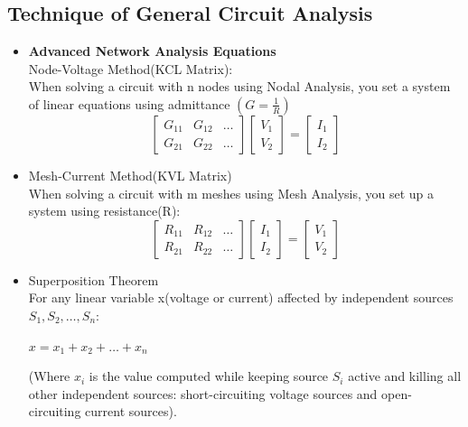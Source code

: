 \documentclass{article}
\begin{document}
\begin{enumerate}
\section{Technique of General Circuit Analysis}
\begin{itemize}
    \item \textbf{Advanced Network Analysis Equations}\\
    Node-Voltage Method(KCL Matrix):\\
    When solving a circuit with n nodes using Nodal Analysis, you set a system of linear equations using admittance $(G = \frac{1}{R}) $
    $$
    \begin{bmatrix}
        G_{11} & G_{12} & \dots \\
        G_{21} & G_{22} & \dots
    \end{bmatrix}
    \begin{bmatrix}
        V_1\\
        V_2
    \end{bmatrix} =
    \begin{bmatrix}
        I_1\\
        I_2
    \end{bmatrix}
    $$
    \item Mesh-Current Method(KVL Matrix)\\
    When solving a circuit with m meshes using Mesh Analysis, you set up a system using resistance(R):\\
    $$
    \begin{bmatrix}
        R_{11} & R_{12} & \dots \\
        R_{21} & R_{22} & \dots
    \end{bmatrix}
    \begin{bmatrix}
        I_1\\
        I_2
    \end{bmatrix} =
    \begin{bmatrix}
        V_1\\
        V_2
    \end{bmatrix}
    $$
    \item Superposition Theorem\\
    For any linear variable x(voltage or current) affected by independent sources $ S_1, S_2, \dots , S_n:$
    \begin{center}
        $ x = x_1 + x_2 + \dots + x_n$
    \end{center}
    (Where $x_i$ is the value computed while keeping source $S_i$ active and killing all other independent sources: short-circuiting voltage sources and open-circuiting current sources).
\end{itemize}

\end{enumerate}
\end{document}
